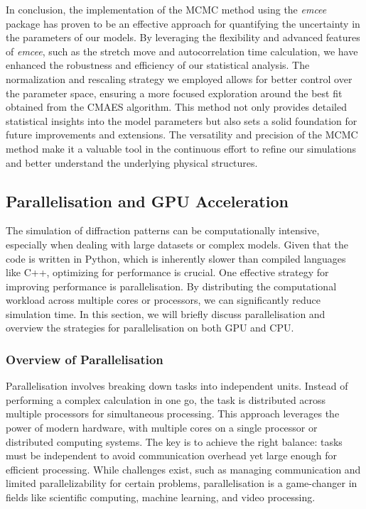 \FloatBarrier

In conclusion, the implementation of the MCMC method using the \textit{emcee} package has proven to be an effective
approach for quantifying the uncertainty in the parameters of our models. By leveraging the flexibility and advanced
features of \textit{emcee}, such as the stretch move and autocorrelation time calculation, we have enhanced the robustness
and efficiency of our statistical analysis. The normalization and rescaling strategy we employed allows for better
control over the parameter space, ensuring a more focused exploration around the best fit obtained from the CMAES
algorithm. This method not only provides detailed statistical insights into the model parameters but also sets 
a solid foundation for future improvements and extensions. The versatility and precision of the MCMC method make 
it a valuable tool in the continuous effort to refine our simulations and better understand the underlying physical structures.


\subsection{Parallelisation and GPU Acceleration}

The simulation of diffraction patterns can be computationally intensive, especially when dealing with large datasets or complex models. 
Given that the code is written in Python, which is inherently slower than compiled languages like C++, optimizing for performance is crucial. 
One effective strategy for improving performance is parallelisation. By distributing the computational workload across multiple cores or processors, 
we can significantly reduce simulation time. In this section, we will briefly discuss parallelisation and overview the strategies for parallelisation 
on both GPU and CPU.

\medskip

\subsubsection{Overview of Parallelisation}

Parallelisation involves breaking down tasks into independent units. Instead of performing a complex calculation in one go, the task is 
distributed across multiple processors for simultaneous processing. This approach leverages the power of modern hardware, with multiple cores 
on a single processor or distributed computing systems. The key is to achieve the right balance: tasks must be independent to avoid communication 
overhead yet large enough for efficient processing. While challenges exist, such as managing communication and limited parallelizability for certain 
problems, parallelisation is a game-changer in fields like scientific computing, machine learning, and video processing.

